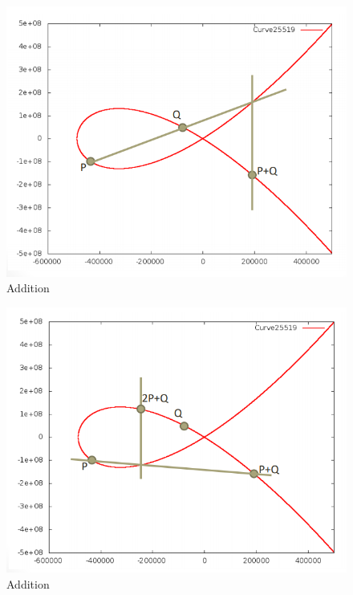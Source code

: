 \begin{minipage}{.5\textwidth}
\begin{figure}[H]
	\begin{center}
		\includegraphics[scale=0.3]{Resources/EC2}
		\caption{Addition}
		\label{fig:EC2}
	\end{center}
\end{figure}
\end{minipage}%
\begin{minipage}{.5\textwidth}
\begin{figure}[H]
	\begin{center}
		\includegraphics[scale=0.3]{Resources/EC3}
		\caption{Addition}
		\label{fig:EC3}
	\end{center}
\end{figure}
\end{minipage}

